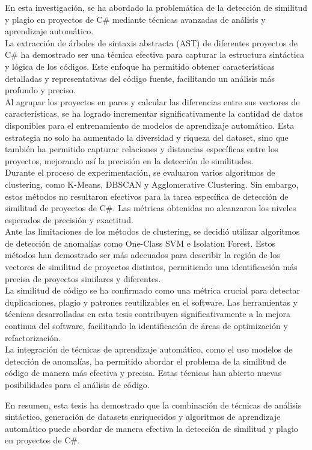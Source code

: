 \begin{conclusions}

En esta investigación, se ha abordado la problemática de la detección de similitud y plagio en proyectos de C\# mediante técnicas avanzadas de análisis y aprendizaje automático.\\

 La extracción de árboles de sintaxis abstracta (AST) de diferentes proyectos de C\# ha demostrado ser una técnica efectiva para capturar la estructura sintáctica y lógica de los códigos. Este enfoque ha permitido obtener características detalladas y representativas del código fuente, facilitando un análisis más profundo y preciso.\\

 Al agrupar los proyectos en pares y calcular las diferencias entre sus vectores de características, se ha logrado incrementar significativamente la cantidad de datos disponibles para el entrenamiento de modelos de aprendizaje automático. Esta estrategia no solo ha aumentado la diversidad y riqueza del dataset, sino que también ha permitido capturar relaciones y distancias específicas entre los proyectos, mejorando así la precisión en la detección de similitudes.\\

Durante el proceso de experimentación, se evaluaron varios algoritmos de clustering, como K-Means, DBSCAN y Agglomerative Clustering. Sin embargo, estos métodos no resultaron efectivos para la tarea específica de detección de similitud de proyectos de C\#. Las métricas obtenidas no alcanzaron los niveles esperados de precisión y exactitud.\\

 Ante las limitaciones de los métodos de clustering, se decidió utilizar algoritmos de detección de anomalías como One-Class SVM e Isolation Forest. Estos métodos han demostrado ser más adecuados para describir la región de los vectores de similitud de proyectos distintos, permitiendo una identificación más precisa de proyectos similares y diferentes.\\

 La similitud de código se ha confirmado como una métrica crucial para detectar duplicaciones, plagio y patrones reutilizables en el software. Las herramientas y técnicas desarrolladas en esta tesis contribuyen significativamente a la mejora continua del software, facilitando la identificación de áreas de optimización y refactorización.\\

 La integración de técnicas de aprendizaje automático, como el uso modelos de detección de anomalías, ha permitido abordar el problema de la similitud de código de manera más efectiva y precisa. Estas técnicas han abierto nuevas posibilidades para el análisis de código.

En resumen, esta tesis ha demostrado que la combinación de técnicas de análisis sintáctico, generación de datasets enriquecidos y algoritmos de aprendizaje automático puede abordar de manera efectiva la detección de similitud y plagio en proyectos de C\#.

\end{conclusions}
